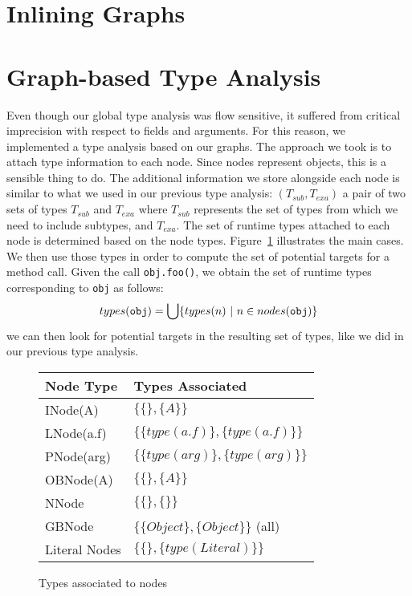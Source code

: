 \section{Inlining Graphs}

\section{Graph-based Type Analysis}
Even though our global type analysis was flow sensitive, it suffered from
critical imprecision with respect to fields and arguments. For this reason, we
implemented a type analysis based on our graphs. The approach we took is to
attach type information to each node. Since nodes represent objects, this is a
sensible thing to do. The additional information we store alongside each node
is similar to what we used in our previous type analysis: $(T_{sub}, T_{exa})$
a pair of two sets of types $T_{sub}$ and $T_{exa}$ where $T_{sub}$ represents
the set of types from which we need to include subtypes, and $T_{exa}$.
The set of runtime types attached to each node is determined based on the node
types. Figure~\ref{fig:pt:types} illustrates the main cases. We then use those
types in order to compute the set of potential targets for a method call. Given
the call \verb/obj.foo()/, we obtain the set of runtime types corresponding to
\verb/obj/ as follows:
$$
    types(\verb/obj/) = \bigcup \{ types(n) ~|~ n \in nodes(\verb/obj/) \}
$$
we can then look for potential targets in the resulting set of types, like we
did in our previous type analysis.


\begin{figure}[h]
    \centering

    \begin{tabular}{ l | l }
        Node Type & Types Associated \\
        \hline
        INode(A)           & $\{\{\}, \{A\}\}$ \\
        LNode(a.f)         & $\{\{type(a.f)\}, \{type(a.f)\}\}$ \\
        PNode(arg)         & $\{\{type(arg)\}, \{type(arg)\}\}$ \\
        OBNode(A)          & $\{\{\},   \{A\}\}$ \\
        NNode              & $\{\{\},   \{\}\}$ \\
        GBNode             & $\{\{Object\},   \{Object\}\}$ (all)\\
        Literal Nodes      & $\{\{\},   \{type(Literal)\}\}$\\
    \end{tabular}

    \caption{Types associated to nodes}
    \label{fig:pt:types}
\end{figure}

